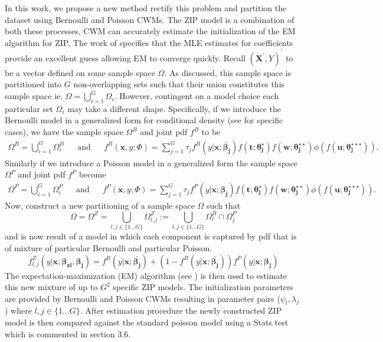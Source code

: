 \documentclass[11pt,letterpaper]{article}
\numberwithin{equation}{section}
\numberwithin{equation}{section}
\numberwithin{equation}{section}
\begin{document}
	In this work, we propose a new method rectify this problem and partition the dataset using Bernoulli and Poisson CWMs.   The ZIP model is a combination of both these processes, CWM can accurately estimate the initialization of the EM algorithm for ZIP.  The work of \cite{Lambert} specifies that the MLE estimates for coefficients provide an excellent guess allowing EM to converge quickly. Recall $(\bm {X^{'}}, Y)^{'}$ to be a vector defined on some sample space $\Omega$. As discussed, this sample space is partitioned into $G$ non-overlapping sets such that their union constitutes this sample space ie. $ \Omega = \bigcup_{i=1}^G \Omega_i $.  However, contingent on a model choice each particular set $\Omega_i$ may take a different shape. Specifically, if we introduce the Bernoulli model in a generalized form for conditional density (see \cite{Ingrassia+Punzo+Vittadini+Minotti:2015} for specific cases), we have the sample space $\Omega^B$ and joint pdf $f^B$ to be \begin{align*} 
\Omega^B =  \bigcup_{i =1}^G \Omega_i^B & & \text{and} &  &
f^B(\bm x, y; \Phi)= \sum_{j=1}^{G} \tau_j f^B(y|\bm{x}; \bm{\bar{\beta_j}}) f(\bm{t};\bm{\theta_j^{\star}})f(\bm{w};\bm{\theta_j^{\star\star}})\phi(f(\bm{u};\bm{\theta_j^{\star\star\star}})). 
\end{align*} 
Similarly if we introduce a Poisson model in a generalized form the sample space $\Omega^P$ and joint pdf $f^P$ become
\begin{align*}
\Omega^P =  \bigcup_{i =1}^G \Omega_i^P & & \text{and} &  &
f^P(\bm x, y; \Phi)= \sum_{j=1}^{G} \tau_j f^P(y|\bm{x};\bm{\beta_{j}}) f(\bm{t};\bm{\theta_j^{\star}})f(\bm{w};\bm{\theta_j^{\star\star}})\phi(f(\bm{u};\bm{\theta_j^{\star\star\star}})).  
\end{align*}
 Now, construct a new partitioning of a sample space $\Omega$ such that 
$$\Omega =  \Omega^Z = \bigcup_{l,j \in \{1 \ldots G \}  } \Omega_{l,j}^Z := \bigcup_{l,j \in \{1 \ldots G \}  }  \Omega_l^B \cap \Omega_j^P $$ and is now result of a model in which each component is captured by pdf that is of mixture of particular Bernoulli and particular Poisson. 
$$f^Z_{l,j}(y|\bm{x;  \beta_{zl}, \beta_j }) = f^B(y|\bm{x}; \bm{\bar{\beta_j}}) +(1-  f^B(y|\bm{x}; \bm{\bar{\beta_j}}) ) f^P(y|\bm{x};\bm{\beta_{j}})  $$
The expectation-maximization (EM) algorithm (see \cite{Dempster+Laird+Rubin:1977}) is then used to estimate this new mixture of up to $G^2$ specific ZIP models. The initialization parameters are provided by Bernoulli and Poisson CWMs resulting in parameter pairs ($ \psi_l,\lambda_j  $) where $l,j \in \{1 \dots G \} $. After estimation procedure the newly constructed ZIP model is then compared against the standard poisson model using a Stats test which is commented in section 3.6. 
\end{document}
